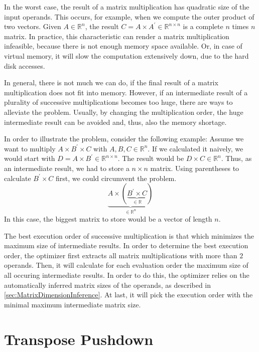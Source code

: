 In the worst case, the result of a matrix multiplication has quadratic size of the input operands.
This occurs, for example, when we compute the outer product of two vectors.
Given $A \in \mathbb{R}^{n}$, the result $C = A\times A^\prime \in \mathbb{R}^{n\times n}$ is a complete $n$ times $n$ matrix.
In practice, this characteristic can render a matrix multiplication infeasible, because there is not enough memory space available.
Or, in case of virtual memory, it will slow the computation extensively down, due to the hard disk accesses.

In general, there is not much we can do, if the final result of a matrix multiplication does not fit into memory.
However, if an intermediate result of a plurality of successive multiplications becomes too huge, there are ways to alleviate the problem.
Usually, by changing the multiplication order, the huge intermediate result can be avoided and, thus, also the memory shortage.

In order to illustrate the problem, consider the following example:
Assume we want to multiply $A\times B^\prime \times C$ with $A,B,C\in \mathbb{R}^{n}$.
If we calculated it naively, we would start with $D=A\times B^\prime \in \mathbb{R}^{n\times n}$.
The result would be $D\times C \in \mathbb{R}^{n}$.
Thus, as an intermediate result, we had to store a $n\times n$ matrix.
Using parentheses to calculate $B^\prime \times C$ first, we could circumvent the problem.
\begin{displaymath}
	\underbrace{A\times \left( \underbrace{B^\prime \times C}_{\in \mathbb{R}}\right)}_{\in \mathbb{R}^{n}}
\end{displaymath}
In this case, the biggest matrix to store would be a vector of length $n$.

The best execution order of successive multiplication is that which minimizes the maximum size of intermediate results.
In order to determine the best execution order, the optimizer first extracts all matrix multiplications with more than $2$ operands.
Then, it will calculate for each evaluation order the maximum size of all occuring intermediate results.
In order to do this, the optimizer relies on the automatically inferred matrix sizes of the operands, as described in \cref{sec:MatrixDimensionInference}.
At last, it will pick the execution order with the minimal maximum intermediate matrix size.

\section{Transpose Pushdown}

